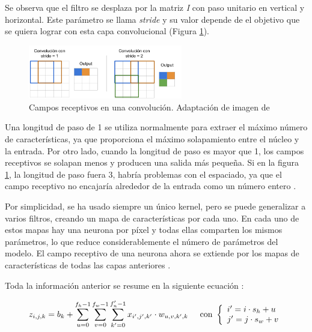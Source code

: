 Se observa que el filtro se desplaza por la matriz \textit{I} con paso unitario en vertical y horizontal. Este parámetro se llama \textit{stride} y su valor depende de el objetivo que se quiera lograr con esta capa convolucional (Figura \ref{fig:receptive_field}).

\begin{figure}[h]
    \centering
    \includegraphics[width=0.6\textwidth]{img/stride.png}
    \caption{Campos receptivos en una convolución. Adaptación de imagen de \citep{yepez2020stride}}
    \label{fig:receptive_field}
\end{figure}

Una longitud de paso de 1 se utiliza normalmente para extraer el máximo número de características, ya que proporciona el máximo solapamiento entre el núcleo y la entrada. Por otro lado, cuando la longitud de paso es mayor que 1, los campos receptivos se solapan menos y producen una salida más pequeña. Si en la figura \ref{fig:receptive_field}, la longitud de paso fuera 3, habría problemas con el espaciado, ya que el campo receptivo no encajaría alrededor de la entrada como un número entero \citep{yepez2020stride}.



Por simplicidad, se ha usado siempre un único kernel, pero se puede generalizar a varios filtros, creando un mapa de características por cada uno. En cada uno de estos mapas hay una neurona por píxel y todas ellas comparten los mismos parámetros, lo que reduce considerablemente el número de parámetros del modelo. El campo receptivo de una neurona ahora se extiende por los mapas de características de todas las capas anteriores \citep{geron2022hands}.



Toda la información anterior se resume en la siguiente ecuación \citep{pajares2021aprendizaje}:

\begin{equation}
z_{i,j,k} = b_k + \sum_{u=0}^{f_h-1} \sum_{v=0}^{f_w-1} \sum_{k'=0}^{f_n'-1} x_{i',j',k'} \cdot w_{u,v,k',k} \hspace{5mm} \textup{con }
\left\{
\begin{array}{l}
i' = i \cdot s_h + u \\
j' = j \cdot s_w + v
\end{array}
\right.
\end{equation} \label{eq:conv}

